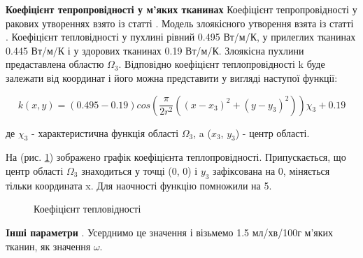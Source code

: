 \textbf{Коефіцієнт тепропровідності у м'яких тканинах} Коефіцієнт тепропровідності у ракових утвореннях взято із статті 
\cite{lung-tumor-thermal-conductivity}. Модель злоякісного утворення взята із статті \cite{tumor-thermal-model}.
Коефіцієнт тепловідності у пухлині рівний 0.495 Вт/м/К, у прилеглих тканинах 0.445 Вт/м/К і у здорових тканинах 
0.19 Вт/м/К. Злоякісна пухлини предаставлена областю $\Omega_3$. Відповідно коефіцієнт теплопровідності k буде залежати
від координат і його можна представити у вигляді наступої функції:

\begin{equation}
    \label{eqn:thermo_2d_thermal_conductivity}
    k(x, y) = (0.495 - 0.19)cos(\frac{\pi}{2r^2}((x - x_3)^2 + (y - y_3)^2))\chi_3 + 0.19
\end{equation}

\noindent де $\chi_3$ - характеристична функція області $\Omega_3$, a ($x_3$, $y_3$) - центр області.

\noindent На (рис. \ref{fig:thermo_2d_thermal_conductivity}) зображено графік коефіцієнта теплопровідності. 
Припускається, що центр області $\Omega_3$ знаходиться у точці (0, 0) і $y_3$ зафіксована на 0, міняється тільки 
координата x. Для наочності функцію помножили на 5. 

\begin{figure}[ht!]
    \centering
    \caption{Коефіцієнт тепловідності}
    \label{fig:thermo_2d_thermal_conductivity}
\end{figure}

\textbf{Iнші параметри} \cite[Пеннес змоделював руку як довгий цилінд і обчислив стаціонарний розроділ температури. 
У його моделі не можна було просто виміряти перфузію крові через м'які тканини $\omega$, тому Пеннес узгодив цей 
параметр із експерементальними даними для фіксованої {\hl???ambient???} температури і метаболічного виділення тепла. Він 
отримав значення перфузії крові $\omega$ між 1.2 і 1.8 мл/хв/100г м'яких тканин, що є типовими діапазоном значень для
м'язів людської руки у стані спокою]{kutz-zhu-heat-transfer-biological-systems}. Усерднимо це значення і візьмемо 
1.5 мл/хв/100г м'яких тканин, як значення $\omega$.

